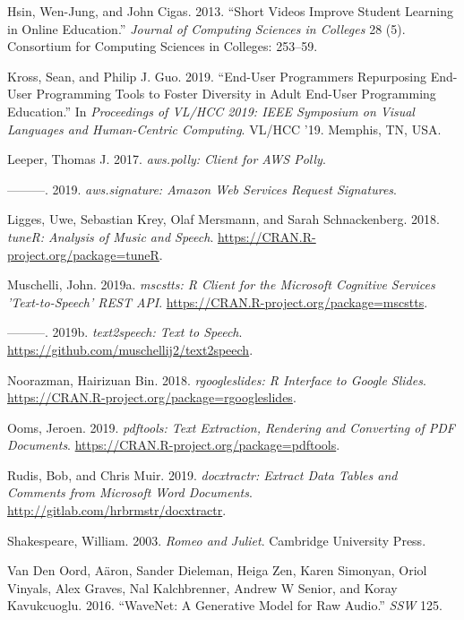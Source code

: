 \leavevmode\hypertarget{ref-hsin2013short}{}%
Hsin, Wen-Jung, and John Cigas. 2013. ``Short Videos Improve Student
Learning in Online Education.'' \emph{Journal of Computing Sciences in
Colleges} 28 (5). Consortium for Computing Sciences in Colleges:
253--59.

\leavevmode\hypertarget{ref-Kross-2019}{}%
Kross, Sean, and Philip J. Guo. 2019. ``End-User Programmers Repurposing
End-User Programming Tools to Foster Diversity in Adult End-User
Programming Education.'' In \emph{Proceedings of VL/HCC 2019: IEEE
Symposium on Visual Languages and Human-Centric Computing}. VL/HCC '19.
Memphis, TN, USA.

\leavevmode\hypertarget{ref-aws.polly}{}%
Leeper, Thomas J. 2017. \emph{aws.polly: Client for AWS Polly}.

\leavevmode\hypertarget{ref-aws.signature}{}%
---------. 2019. \emph{aws.signature: Amazon Web Services Request
Signatures}.

\leavevmode\hypertarget{ref-tuneR}{}%
Ligges, Uwe, Sebastian Krey, Olaf Mersmann, and Sarah Schnackenberg.
2018. \emph{tuneR: Analysis of Music and Speech}.
\url{https://CRAN.R-project.org/package=tuneR}.

\leavevmode\hypertarget{ref-mscstts}{}%
Muschelli, John. 2019a. \emph{mscstts: R Client for the Microsoft
Cognitive Services 'Text-to-Speech' REST API}.
\url{https://CRAN.R-project.org/package=mscstts}.

\leavevmode\hypertarget{ref-text2speech}{}%
---------. 2019b. \emph{text2speech: Text to Speech}.
\url{https://github.com/muschellij2/text2speech}.

\leavevmode\hypertarget{ref-rgoogleslides}{}%
Noorazman, Hairizuan Bin. 2018. \emph{rgoogleslides: R Interface to
Google Slides}. \url{https://CRAN.R-project.org/package=rgoogleslides}.

\leavevmode\hypertarget{ref-pdftools}{}%
Ooms, Jeroen. 2019. \emph{pdftools: Text Extraction, Rendering and
Converting of PDF Documents}.
\url{https://CRAN.R-project.org/package=pdftools}.

\leavevmode\hypertarget{ref-docxtractr}{}%
Rudis, Bob, and Chris Muir. 2019. \emph{docxtractr: Extract Data Tables
and Comments from Microsoft Word Documents}.
\url{http://gitlab.com/hrbrmstr/docxtractr}.

\leavevmode\hypertarget{ref-shakespeare2003romeo}{}%
Shakespeare, William. 2003. \emph{Romeo and Juliet}. Cambridge
University Press.

\leavevmode\hypertarget{ref-van2016wavenet}{}%
Van Den Oord, Aäron, Sander Dieleman, Heiga Zen, Karen Simonyan, Oriol
Vinyals, Alex Graves, Nal Kalchbrenner, Andrew W Senior, and Koray
Kavukcuoglu. 2016. ``WaveNet: A Generative Model for Raw Audio.''
\emph{SSW} 125.

